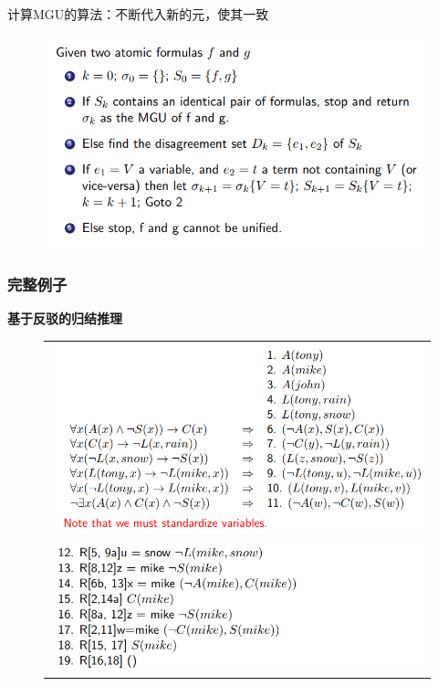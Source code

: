 计算MGU的算法：不断代入新的元，使其一致
\begin{figure}[H]
\centering
\includegraphics[width=0.8\linewidth]{fig/MGU.png}
\end{figure}

\subsubsection{完整例子}
\textbf{基于反驳的归结推理}
\begin{figure}[H]
\centering
\begin{tabular}{c}
\includegraphics[width=0.8\linewidth]{fig/alpine_club_eg1.png}\\
\includegraphics[width=0.8\linewidth]{fig/alpine_club_eg2.png}
\end{tabular}
\end{figure}

